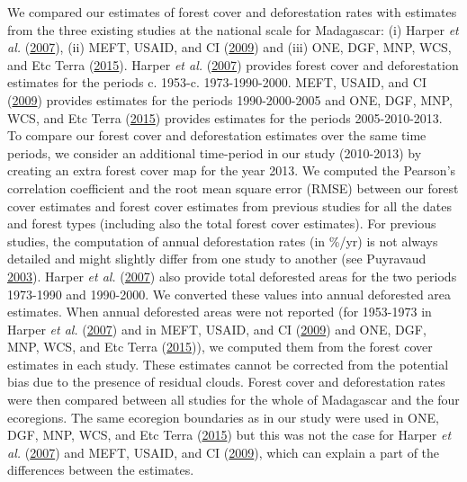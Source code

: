 \documentclass[]{article}
\theoremstyle{definition}
\theoremstyle{definition}
\theoremstyle{definition}
\theoremstyle{remark}
\begin{document}
We compared our estimates of forest cover and deforestation rates with
estimates from the three existing studies at the national scale for
Madagascar: (i) Harper \emph{et al.}
(\protect\hyperlink{ref-Harper2007}{2007}), (ii) MEFT, USAID, and CI
(\protect\hyperlink{ref-MEFT2009}{2009}) and (iii) ONE, DGF, MNP, WCS,
and Etc Terra (\protect\hyperlink{ref-ONE2015}{2015}). Harper \emph{et
al.} (\protect\hyperlink{ref-Harper2007}{2007}) provides forest cover
and deforestation estimates for the periods c. 1953-c. 1973-1990-2000.
MEFT, USAID, and CI (\protect\hyperlink{ref-MEFT2009}{2009}) provides
estimates for the periods 1990-2000-2005 and ONE, DGF, MNP, WCS, and Etc
Terra (\protect\hyperlink{ref-ONE2015}{2015}) provides estimates for the
periods 2005-2010-2013. To compare our forest cover and deforestation
estimates over the same time periods, we consider an additional
time-period in our study (2010-2013) by creating an extra forest cover
map for the year 2013. We computed the Pearson's correlation coefficient
and the root mean square error (RMSE) between our forest cover estimates
and forest cover estimates from previous studies for all the dates and
forest types (including also the total forest cover estimates). For
previous studies, the computation of annual deforestation rates (in
\%/yr) is not always detailed and might slightly differ from one study
to another (see Puyravaud \protect\hyperlink{ref-Puyravaud2003}{2003}).
Harper \emph{et al.} (\protect\hyperlink{ref-Harper2007}{2007}) also
provide total deforested areas for the two periods 1973-1990 and
1990-2000. We converted these values into annual deforested area
estimates. When annual deforested areas were not reported (for 1953-1973
in Harper \emph{et al.} (\protect\hyperlink{ref-Harper2007}{2007}) and
in MEFT, USAID, and CI (\protect\hyperlink{ref-MEFT2009}{2009}) and ONE,
DGF, MNP, WCS, and Etc Terra (\protect\hyperlink{ref-ONE2015}{2015})),
we computed them from the forest cover estimates in each study. These
estimates cannot be corrected from the potential bias due to the
presence of residual clouds. Forest cover and deforestation rates were
then compared between all studies for the whole of Madagascar and the
four ecoregions. The same ecoregion boundaries as in our study were used
in ONE, DGF, MNP, WCS, and Etc Terra
(\protect\hyperlink{ref-ONE2015}{2015}) but this was not the case for
Harper \emph{et al.} (\protect\hyperlink{ref-Harper2007}{2007}) and
MEFT, USAID, and CI (\protect\hyperlink{ref-MEFT2009}{2009}), which can
explain a part of the differences between the estimates.
\end{document}
